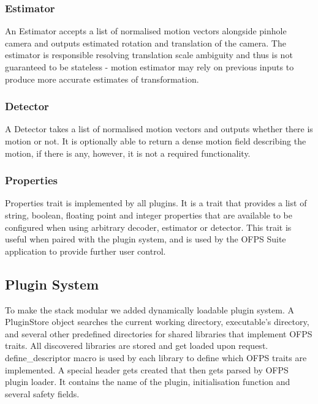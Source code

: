 \documentclass[11pt,english]{report}
\begin{document}
\subsubsection{Estimator}

An Estimator accepts a list of normalised motion vectors alongside pinhole camera and outputs estimated rotation and translation of the camera. The estimator is responsible resolving translation scale ambiguity and thus is not guaranteed to be stateless - motion estimator may rely on previous inputs to produce more accurate estimates of transformation.

\subsubsection{Detector}

A Detector takes a list of normalised motion vectors and outputs whether there is motion or not. It is optionally able to return a dense motion field describing the motion, if there is any, however, it is not a required functionality.

\subsubsection{Properties}

Properties trait is implemented by all plugins. It is a trait that provides a list of string, boolean, floating point and integer properties that are available to be configured when using arbitrary decoder, estimator or detector. This trait is useful when paired with the plugin system, and is used by the OFPS Suite application to provide further user control.

\subsection{Plugin System}

To make the stack modular we added dynamically loadable plugin system. A PluginStore object searches the current working directory, executable's directory, and several other predefined directories for shared libraries that implement OFPS traits. All discovered libraries are stored and get loaded upon request. define\_descriptor macro is used by each library to define which OFPS traits are implemented. A special header gets created that then gets parsed by OFPS plugin loader. It contains the name of the plugin, initialisation function and several safety fields.
\end{document}
